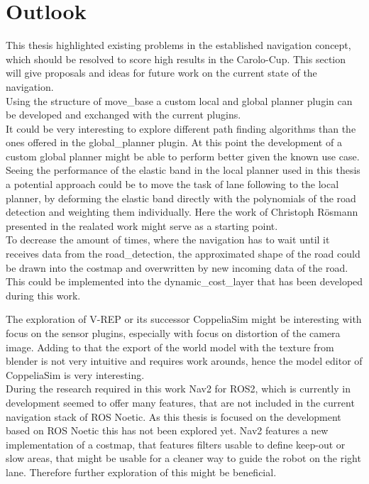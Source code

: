 \chapter{Outlook}
\label{outlook}

This thesis highlighted existing problems in the established navigation concept, which should be resolved to score high results in the Carolo-Cup. This section will give proposals and ideas for future work on the current state of the navigation.\\

Using the structure of move\_base a custom local and global planner plugin can be developed and exchanged with the current plugins.\\

It could be very interesting to explore different path finding algorithms than the ones offered in the global\_planner plugin. At this point the development of a custom global planner might be able to perform better given the known use case.\\

Seeing the performance of the elastic band in the local planner used in this thesis a potential approach could be to move the task of lane following to the local planner, by deforming the elastic band directly with the polynomials of the road detection and weighting them individually. Here the work of Christoph Rösmann presented in the realated work might serve as a starting point.\\

To decrease the amount of times, where the navigation has to wait until it receives data from the road\_detection, the approximated shape of the road could be drawn into the costmap and overwritten by new incoming data of the road. This could be implemented into the dynamic\_cost\_layer that has been developed during this work.

The exploration of V-REP or its successor CoppeliaSim might be interesting with focus on the sensor plugins, especially with focus on distortion of the camera image. Adding to that the export of the world model with the texture from blender is not very intuitive and requires work arounds, hence the model editor of CoppeliaSim is very interesting. \\

During the research required in this work Nav2 for ROS2, which is currently in development seemed to offer many features, that are not included in the current navigation stack of ROS Noetic. As this thesis is focused on the development based on ROS Noetic this has not been explored yet. Nav2 features a new implementation of a costmap, that features filters usable to define keep-out or slow areas, that might be usable for a cleaner way to guide the robot on the right lane. Therefore further exploration of this might be beneficial.\\

